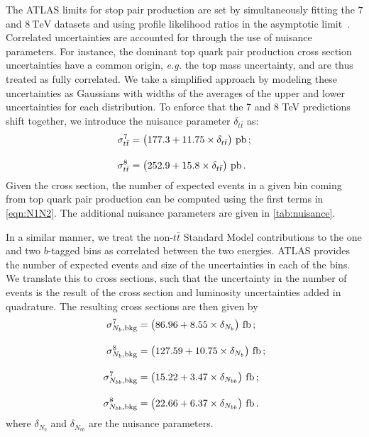 \documentclass[a4paper,12pt]{article}
\newcommand{\tev}{~\text{TeV}}
\newcommand{\pb}{~\mathrm{pb}}
\begin{document}
The ATLAS limits for stop pair production are set by simultaneously fitting the $7$ and $8\tev$ datasets and using profile likelihood ratios in the asymptotic limit~\cite{Cowan:2010js}. Correlated uncertainties are accounted for through the use of nuisance parameters. For instance, the dominant top quark pair production cross section uncertainties have a common origin, \emph{e.g.} the top mass uncertainty, and are thus treated as fully correlated. We take a simplified approach by modeling these uncertainties as Gaussians with widths of the averages of the upper and lower uncertainties for each distribution. To enforce that the 7 and 8 TeV predictions shift together, we introduce the nuisance parameter $\delta_{t\bar{t}}$ as:
\begin{align}
\sigma_{t\bar{t}}^7 &= \big(177.3  + 11.75 \times \delta_{t\bar{t}} \big) \pb\,; \notag \\[10pt] 
\sigma_{t\bar{t}}^8 &= \big(252.9  + 15.8 \times \delta_{t\bar{t}} \big) \pb\,.
\label{eq:sigmattbar}
\end{align}
Given the cross section, the number of expected events in a given bin coming from top quark pair production can be computed using the first terms in \cref{eqn:N1N2}. The additional nuisance parameters are given in \cref{tab:nuisance}.

In a similar manner, we treat the non-$t\bar{t}$ Standard Model contributions to the one and two $b$-tagged bins as correlated between the two energies.  ATLAS provides the number of expected events and size of the uncertainties in each of the bins. We translate this to cross sections, such that the uncertainty in the number of events is the result of the cross section and luminosity uncertainties added in quadrature. The resulting cross sections are then given by 
\begin{align}
\sigma_{N_b, \text{bkg}}^7 &= \big(86.96 + 8.55 \times \delta_{N_b} \big) ~\mathrm{fb}\,; \notag \\[10pt]
\sigma_{N_b, \text{bkg}}^8 &= \big(127.59 + 10.75 \times \delta_{N_b} \big) ~\mathrm{fb}\,; \notag \\[10pt]
\sigma_{N_{bb}, \text{bkg}}^7 &= \big(15.22 + 3.47 \times \delta_{N_{bb}} \big) ~\mathrm{fb}\,; \notag \\[10pt]
\sigma_{N_{bb}, \text{bkg}}^8 &= \big(22.66 + 6.37 \times \delta_{N_{bb}} \big) ~\mathrm{fb}\,.
\end{align}
where $\delta_{N_b}$ and $\delta_{N_{bb}}$ are the nuisance parameters.
\end{document}
